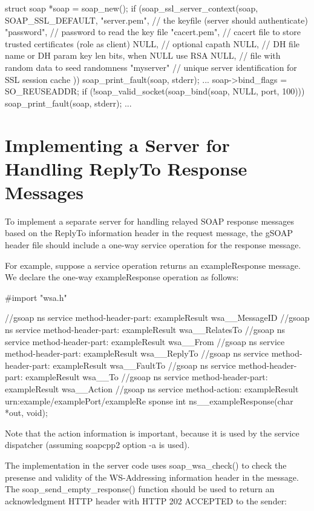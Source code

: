 \begin{DoxyCode}
struct soap *soap = soap_new();
if (soap_ssl_server_context(soap,
  SOAP_SSL_DEFAULT,
  "server.pem", // the keyfile (server should authenticate)
  "password",   // password to read the key file
  "cacert.pem", // cacert file to store trusted certificates (role as client)
  NULL,         // optional capath
  NULL,         // DH file name or DH param key len bits, when NULL use RSA
  NULL,         // file with random data to seed randomness
  "myserver"    // unique server identification for SSL session cache
))
{ soap_print_fault(soap, stderr);
  ...
}
soap->bind_flags = SO_REUSEADDR;
if (!soap_valid_socket(soap_bind(soap, NULL, port, 100)))
{ soap_print_fault(soap, stderr);
  ...
}
\end{DoxyCode}
\hypertarget{wsa__0_wsa_5}{}\section{Implementing a Server for Handling ReplyTo Response Messages}\label{wsa__0_wsa_5}
To implement a separate server for handling relayed SOAP response messages based on the ReplyTo information header in the request message, the gSOAP header file should include a one-\/way service operation for the response message.

For example, suppose a service operation returns an exampleResponse message. We declare the one-\/way exampleResponse operation as follows:


\begin{DoxyCode}
#import "wsa.h"

//gsoap ns service method-header-part: exampleResult wsa__MessageID
//gsoap ns service method-header-part: exampleResult wsa__RelatesTo
//gsoap ns service method-header-part: exampleResult wsa__From
//gsoap ns service method-header-part: exampleResult wsa__ReplyTo
//gsoap ns service method-header-part: exampleResult wsa__FaultTo
//gsoap ns service method-header-part: exampleResult wsa__To
//gsoap ns service method-header-part: exampleResult wsa__Action
//gsoap ns service method-action: exampleResult urn:example/examplePort/exampleRe
      sponse
int ns__exampleResponse(char *out, void);
\end{DoxyCode}


Note that the action information is important, because it is used by the service dispatcher (assuming soapcpp2 option -\/a is used).

The implementation in the server code uses soap\_\-wsa\_\-check() to check the presense and validity of the WS-\/Addressing information header in the message. The soap\_\-send\_\-empty\_\-response() function should be used to return an acknowledgment HTTP header with HTTP 202 ACCEPTED to the sender:


